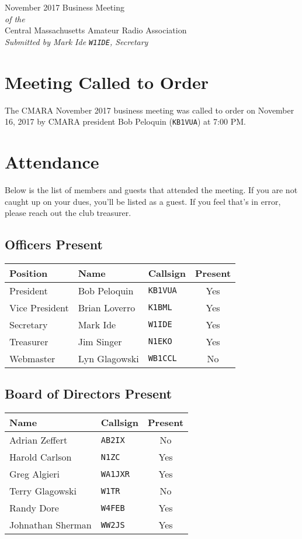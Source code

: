 \documentclass[10pt,letterpaper]{article}
\begin{document}
\begin{center}
{\huge November 2017 Business Meeting}\\
\emph{of the}\\
{\Large Central Massachusetts Amateur Radio Association}\\
\emph{Submitted by Mark Ide \texttt{W1IDE}, Secretary}
\end{center}

\section{Meeting Called to Order}
The CMARA November 2017 business meeting was called to order on November 16, 2017 by CMARA president Bob Peloquin (\texttt{KB1VUA}) at 7:00 PM.

\section{Attendance}
\noindent
Below is the list of members and guests that attended the meeting. If you are not caught up on your dues, you'll be listed as a guest. If you feel that's in error, please reach out the club treasurer.

\subsection{Officers Present}
\begin{tabular}{|l|l|l|c|}
  \hline
  \textbf{Position} & \textbf{Name}  & \textbf{Callsign} & \textbf{Present} \\ \hline
  President         & Bob Peloquin   & \texttt{KB1VUA}   & Yes \\
  Vice President    & Brian Loverro  & \texttt{K1BML}    & Yes \\
  Secretary         & Mark Ide       & \texttt{W1IDE}    & Yes \\
  Treasurer         & Jim Singer     & \texttt{N1EKO}    & Yes \\
  Webmaster         & Lyn Glagowski  & \texttt{WB1CCL}   & No  \\
  \hline
\end{tabular}

\subsection{Board of Directors Present}
\begin{tabular}{|l|l|c|}
  \hline
  \textbf{Name}     & \textbf{Callsign} & \textbf{Present} \\ \hline
  Adrian Zeffert    & \texttt{AB2IX}    & No  \\
  Harold Carlson    & \texttt{N1ZC}     & Yes \\
  Greg Algieri      & \texttt{WA1JXR}   & Yes \\
  Terry Glagowski   & \texttt{W1TR}     & No  \\
  Randy Dore        & \texttt{W4FEB}    & Yes \\
  Johnathan Sherman & \texttt{WW2JS}    & Yes \\
  \hline
\end{tabular}
\end{document}
